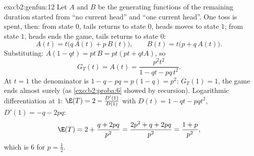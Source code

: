 \begin{solution}{exo:b2:genfun:12}
Let $A$ and $B$ be the generating functions of the remaining
duration started from ``no current head'' and ``one current
head''. One toss is spent, then: from state $0$, tails
returns to state $0$, heads moves to state $1$; from state
$1$, heads ends the game, tails returns to state $0$:
\[
A(t) = t\bigl(q\,A(t) + p\,B(t)\bigr),
\qquad
B(t) = t\bigl(p + q\,A(t)\bigr).
\]
Substituting: $A(1 - qt) = pt\,B = pt(pt + qtA)$, so
\[
G_T(t) = A(t) = \frac{p^2t^2}{1 - qt - pq\,t^2} .
\]
At $t = 1$ the denominator is $1 - q - pq = p(1 - q) = p^2$:
$G_T(1) = 1$, the game ends almost surely (as
\cref{exo:b2:proba:6} showed by recursion). Logarithmic
differentiation at $1$: $\E(T) = 2 - \frac{D'(1)}{D(1)}$ with
$D(t) = 1 - qt - pqt^2$, $D'(1) = -q - 2pq$:
\[
\E(T) = 2 + \frac{q + 2pq}{p^2} = \frac{2p^2 + q + 2pq}{p^2}
= \frac{1 + p}{p^2},
\]
which is $6$ for $p = \frac12$.
\end{solution}

